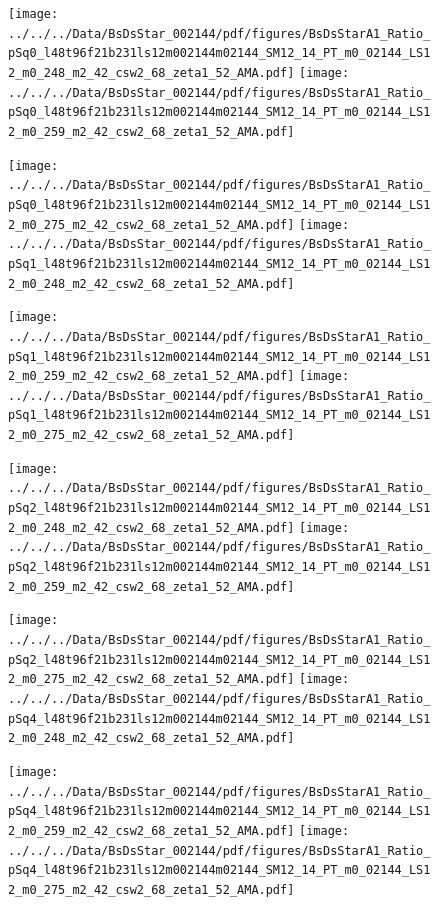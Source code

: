 \documentclass[a4paper,10pt]{article}
\begin{document}
\begin{figure}[p]
 \texttt{[image: ../../../Data/BsDsStar\_002144/pdf/figures/BsDsStarA1\_Ratio\_pSq0\_l48t96f21b231ls12m002144m02144\_SM12\_14\_PT\_m0\_02144\_LS12\_m0\_248\_m2\_42\_csw2\_68\_zeta1\_52\_AMA.pdf]} 
 \texttt{[image: ../../../Data/BsDsStar\_002144/pdf/figures/BsDsStarA1\_Ratio\_pSq0\_l48t96f21b231ls12m002144m02144\_SM12\_14\_PT\_m0\_02144\_LS12\_m0\_259\_m2\_42\_csw2\_68\_zeta1\_52\_AMA.pdf]} 
 \end{figure}
\begin{figure}[p]
 \texttt{[image: ../../../Data/BsDsStar\_002144/pdf/figures/BsDsStarA1\_Ratio\_pSq0\_l48t96f21b231ls12m002144m02144\_SM12\_14\_PT\_m0\_02144\_LS12\_m0\_275\_m2\_42\_csw2\_68\_zeta1\_52\_AMA.pdf]} 
 \texttt{[image: ../../../Data/BsDsStar\_002144/pdf/figures/BsDsStarA1\_Ratio\_pSq1\_l48t96f21b231ls12m002144m02144\_SM12\_14\_PT\_m0\_02144\_LS12\_m0\_248\_m2\_42\_csw2\_68\_zeta1\_52\_AMA.pdf]} 
 \end{figure}
\begin{figure}[p]
 \texttt{[image: ../../../Data/BsDsStar\_002144/pdf/figures/BsDsStarA1\_Ratio\_pSq1\_l48t96f21b231ls12m002144m02144\_SM12\_14\_PT\_m0\_02144\_LS12\_m0\_259\_m2\_42\_csw2\_68\_zeta1\_52\_AMA.pdf]} 
 \texttt{[image: ../../../Data/BsDsStar\_002144/pdf/figures/BsDsStarA1\_Ratio\_pSq1\_l48t96f21b231ls12m002144m02144\_SM12\_14\_PT\_m0\_02144\_LS12\_m0\_275\_m2\_42\_csw2\_68\_zeta1\_52\_AMA.pdf]} 
 \end{figure}
\clearpage
\begin{figure}[p]
 \texttt{[image: ../../../Data/BsDsStar\_002144/pdf/figures/BsDsStarA1\_Ratio\_pSq2\_l48t96f21b231ls12m002144m02144\_SM12\_14\_PT\_m0\_02144\_LS12\_m0\_248\_m2\_42\_csw2\_68\_zeta1\_52\_AMA.pdf]} 
 \texttt{[image: ../../../Data/BsDsStar\_002144/pdf/figures/BsDsStarA1\_Ratio\_pSq2\_l48t96f21b231ls12m002144m02144\_SM12\_14\_PT\_m0\_02144\_LS12\_m0\_259\_m2\_42\_csw2\_68\_zeta1\_52\_AMA.pdf]} 
 \end{figure}
\begin{figure}[p]
 \texttt{[image: ../../../Data/BsDsStar\_002144/pdf/figures/BsDsStarA1\_Ratio\_pSq2\_l48t96f21b231ls12m002144m02144\_SM12\_14\_PT\_m0\_02144\_LS12\_m0\_275\_m2\_42\_csw2\_68\_zeta1\_52\_AMA.pdf]} 
 \texttt{[image: ../../../Data/BsDsStar\_002144/pdf/figures/BsDsStarA1\_Ratio\_pSq4\_l48t96f21b231ls12m002144m02144\_SM12\_14\_PT\_m0\_02144\_LS12\_m0\_248\_m2\_42\_csw2\_68\_zeta1\_52\_AMA.pdf]} 
 \end{figure}
\begin{figure}[p]
 \texttt{[image: ../../../Data/BsDsStar\_002144/pdf/figures/BsDsStarA1\_Ratio\_pSq4\_l48t96f21b231ls12m002144m02144\_SM12\_14\_PT\_m0\_02144\_LS12\_m0\_259\_m2\_42\_csw2\_68\_zeta1\_52\_AMA.pdf]} 
 \texttt{[image: ../../../Data/BsDsStar\_002144/pdf/figures/BsDsStarA1\_Ratio\_pSq4\_l48t96f21b231ls12m002144m02144\_SM12\_14\_PT\_m0\_02144\_LS12\_m0\_275\_m2\_42\_csw2\_68\_zeta1\_52\_AMA.pdf]} 
 \end{figure}
\end{document}
